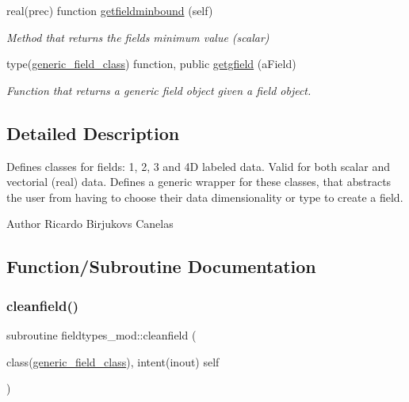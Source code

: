 \begin{DoxyCompactItemize}
real(prec) function \mbox{\hyperlink{namespacefieldtypes__mod_aec092e7c0b82a7b3a828ae18af80b810}{getfieldminbound}} (self)
\begin{DoxyCompactList}\small\item\em Method that returns the field\textquotesingle{}s minimum value (scalar) \end{DoxyCompactList}\item 
type(\mbox{\hyperlink{structfieldtypes__mod_1_1generic__field__class}{generic\+\_\+field\+\_\+class}}) function, public \mbox{\hyperlink{namespacefieldtypes__mod_a73c64e544ca15d30975aad5a35c2d904}{getgfield}} (a\+Field)
\begin{DoxyCompactList}\small\item\em Function that returns a generic field object given a field object. \end{DoxyCompactList}\end{DoxyCompactItemize}


\subsection{Detailed Description}
Defines classes for \textquotesingle{}fields\textquotesingle{}\+: 1, 2, 3 and 4D labeled data. Valid for both scalar and vectorial (real) data. Defines a generic wrapper for these classes, that abstracts the user from having to choose their data dimensionality or type to create a field. 

\begin{DoxyAuthor}{Author}
Ricardo Birjukovs Canelas 
\end{DoxyAuthor}


\subsection{Function/\+Subroutine Documentation}
\mbox{\label{namespacefieldtypes__mod_a1d491079d69fb297c4fedd4f37d85e8e}} 
\subsubsection{\texorpdfstring{cleanfield()}{cleanfield()}}
{\footnotesize\ttfamily subroutine fieldtypes\+\_\+mod\+::cleanfield (\begin{DoxyParamCaption}\item[{class(\mbox{\hyperlink{structfieldtypes__mod_1_1generic__field__class}{generic\+\_\+field\+\_\+class}}), intent(inout)}]{self }\end{DoxyParamCaption})\hspace{0.3cm}{\ttfamily [private]}}



